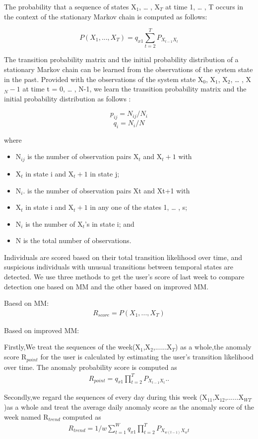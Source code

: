 \documentclass[conference]{IEEEtran}
\begin{document}
The probability that a sequence of states X$_1$, … , X$_T$ at time 1, … , T occurs in the context of the stationary Markov chain is computed as follows:

$$P(X_1,...,X_T)=q_{x1}\sum_{t=2}^T P_{X_{t-1}X_t}$$

The transition probability matrix and the initial probability distribution of a stationary Markov chain can be learned from the observations of the system
state in the past. Provided with the observations of the system state X$_0$, X$_1$, X$_2$, … , X$_N-1$ at time t = 0, … , N-1, we learn the transition probability matrix and the initial probability distribution as follows \cite{b47}:

$$p_{ij}=N_{ij}/N_i$$
$$q_i=N_i/N$$

where
\begin{itemize}
\item N$_{ij}$ is the number of observation pairs X$_t$ and X$_t+1$ with
\item X$_t$ in state i and X$_t+1$ in state j;
\item N$_i$. is the number of observation pairs Xt and Xt+1 with
\item X$_t$ in state i and X$_t+1$ in any one of the states 1, … , s;
\item N$_i$ is the number of X$_t$’s in state i; and
\item N is the total number of observations.
\end{itemize}
\fi

Individuals are scored based on their total transition likelihood over time, and suspicious individuals with unusual transitions between temporal states are detected. We use three methods to get the user’s score of last week to compare detection one based on MM and the other based on improved MM.

Baesd on MM:
\begin{align}
R_{score} = P(X_1,...,X_T)
\end{align}


Based on improved MM:

Firstly,We treat the sequences of the week(X$_1$,X$_2$,......X$_T$) as a whole,the anomaly score R$_{point}$ for the user is calculated by estimating the user’s transition likelihood over time. The anomaly probability score is computed as
\begin{align}
R_{point}=q_{x1}\prod_{t=2}^T P_{X_{t-1}X_t}..
\end{align}

Secondly,we regard the sequences of every day during this week (X$_{11}$,X$_{12}$,......X$_{WT}$)as a whole and treat the average daily anomaly score as the anomaly score of the week named R$_{trend}$ computed as 
\begin{align}
R_{trend}=1/w\sum_{t=1}^W {q_{x1}\prod_{t=2}^T P_{X_{w(t-1)}X_wt}}
\end{align}
\end{document}
